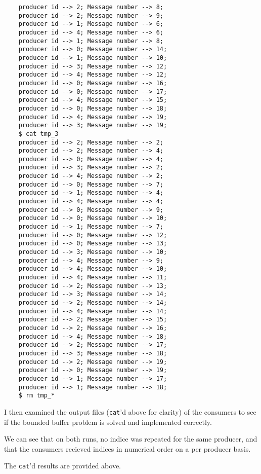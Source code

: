 \documentclass[11pt]{article}
\begin{document}
\begin{question}
\begin{subquestion}
\begin{itemize}
{\begin{verbatim}
    producer id --> 2; Message number --> 8;
    producer id --> 2; Message number --> 9;
    producer id --> 1; Message number --> 6;
    producer id --> 4; Message number --> 6;
    producer id --> 1; Message number --> 8;
    producer id --> 0; Message number --> 14;
    producer id --> 1; Message number --> 10;
    producer id --> 3; Message number --> 12;
    producer id --> 4; Message number --> 12;
    producer id --> 0; Message number --> 16;
    producer id --> 0; Message number --> 17;
    producer id --> 4; Message number --> 15;
    producer id --> 0; Message number --> 18;
    producer id --> 4; Message number --> 19;
    producer id --> 3; Message number --> 19;
    $ cat tmp_3
    producer id --> 2; Message number --> 2;
    producer id --> 2; Message number --> 4;
    producer id --> 0; Message number --> 4;
    producer id --> 3; Message number --> 2;
    producer id --> 4; Message number --> 2;
    producer id --> 0; Message number --> 7;
    producer id --> 1; Message number --> 4;
    producer id --> 4; Message number --> 4;
    producer id --> 0; Message number --> 9;
    producer id --> 0; Message number --> 10;
    producer id --> 1; Message number --> 7;
    producer id --> 0; Message number --> 12;
    producer id --> 0; Message number --> 13;
    producer id --> 3; Message number --> 10;
    producer id --> 4; Message number --> 9;
    producer id --> 4; Message number --> 10;
    producer id --> 4; Message number --> 11;
    producer id --> 2; Message number --> 13;
    producer id --> 3; Message number --> 14;
    producer id --> 2; Message number --> 14;
    producer id --> 4; Message number --> 14;
    producer id --> 2; Message number --> 15;
    producer id --> 2; Message number --> 16;
    producer id --> 4; Message number --> 18;
    producer id --> 2; Message number --> 17;
    producer id --> 3; Message number --> 18;
    producer id --> 2; Message number --> 19;
    producer id --> 0; Message number --> 19;
    producer id --> 1; Message number --> 17;
    producer id --> 1; Message number --> 18;
    $ rm tmp_*
                \end{verbatim}
            }
        \end{itemize}

    \end{subquestion}
    \begin{subquestion}
        I then examined the output files ({\tt cat}'d above for clarity) of the consumers to see if the bounded buffer problem is solved and implemented correctly.

        We can see that on both runs, no indice was repeated for the same producer, and that the consumers recieved indices in numerical order on a per producer basis.
    \end{subquestion}
    \begin{subquestion}
        The {\tt cat}'d results are provided above.
    \end{subquestion}
    \end{question}
\end{document}

